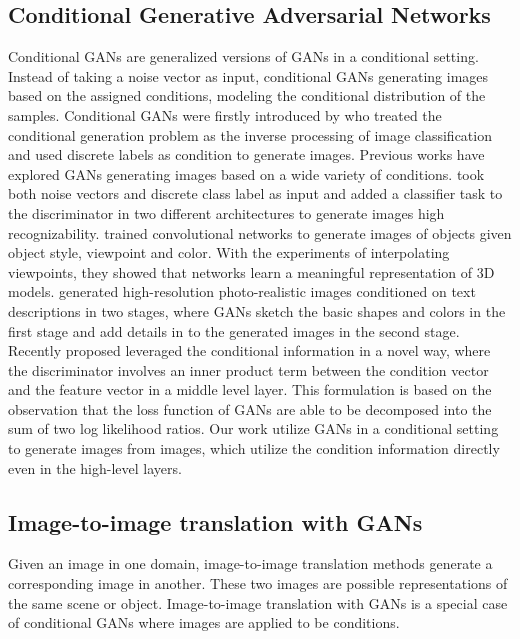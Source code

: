 \subsection{Conditional Generative Adversarial Networks}
Conditional GANs are generalized versions of GANs in a conditional setting. Instead of taking a noise vector as input, conditional GANs generating images based on the assigned conditions, modeling the conditional distribution of the samples. 
Conditional GANs were firstly introduced by \cite{CGAN} who treated the conditional generation problem as the inverse processing of image classification and used discrete labels as condition to generate images. Previous works have explored GANs generating images based on a wide variety of conditions.
\cite{InfoGANs, AcGANs} took both noise vectors and discrete class label as input and added a classifier task to the discriminator in two different architectures to generate images high recognizability.   
%
\cite{Dosovitskiy2014} trained convolutional networks to generate images of objects given object style, viewpoint and color. With the experiments of interpolating viewpoints, they showed that networks learn a meaningful representation of 3D models. 
%
\cite{StackGANs, StackGANs++} generated high-resolution photo-realistic images conditioned on text descriptions in two stages, where GANs sketch the basic shapes and colors in the first stage and add details in to the generated images in the second stage.  
%
Recently proposed \cite{ProjectGANs} leveraged the conditional information in a novel way, where the discriminator involves an inner product term between the condition vector and the feature vector in a middle level layer. This formulation is based on the observation that the loss function of GANs are able to be decomposed into the sum of two log likelihood ratios.
%
Our work utilize GANs in a conditional setting to generate images from images, which utilize the condition information directly even in the high-level layers.
%
%
\subsection{Image-to-image translation with GANs}
Given an image in one domain, image-to-image translation methods generate a corresponding image in another. These two images are possible representations of the same scene or object. Image-to-image translation with GANs is a special case of conditional GANs where images are applied to be conditions. 
%

